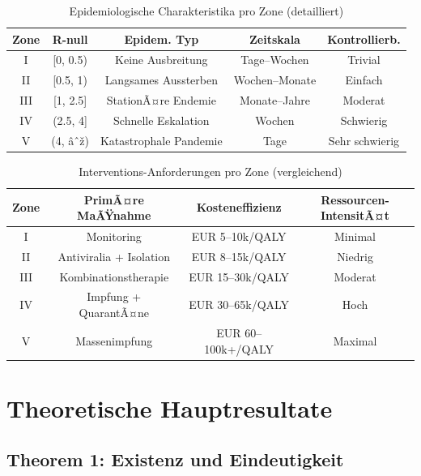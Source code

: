 ﻿\documentclass[a4paper,12pt,twoside]{article}
\theoremstyle{definition}
\begin{document}
\begin{table}[h!]
\centering
\caption{Epidemiologische Charakteristika pro Zone (detailliert)}
\label{tab:zones_detailed}
\begin{tabular}{|c|c|c|c|c|}
\hline
\textbf{Zone} & \textbf{R-null} & \textbf{Epidem. Typ} & \textbf{Zeitskala} & \textbf{Kontrollierb.} \\
\hline
I & [0, 0.5) & Keine Ausbreitung & Tage--Wochen & Trivial \\
II & [0.5, 1) & Langsames Aussterben & Wochen--Monate & Einfach \\
III & [1, 2.5] & StationÃ¤re Endemie & Monate--Jahre & Moderat \\
IV & (2.5, 4] & Schnelle Eskalation & Wochen & Schwierig \\
V & (4, âˆž) & Katastrophale Pandemie & Tage & Sehr schwierig \\
\hline
\end{tabular}
\end{table}

\begin{table}[h!]
\centering
\caption{Interventions-Anforderungen pro Zone (vergleichend)}
\label{tab:interventions_summary}
\begin{tabular}{|c|c|c|c|}
\hline
\textbf{Zone} & \textbf{PrimÃ¤re MaÃŸnahme} & \textbf{Kosteneffizienz} & \textbf{Ressourcen-IntensitÃ¤t} \\
\hline
I & Monitoring & EUR 5--10k/QALY & Minimal \\
II & Antiviralia + Isolation & EUR 8--15k/QALY & Niedrig \\
III & Kombinationstherapie & EUR 15--30k/QALY & Moderat \\
IV & Impfung + QuarantÃ¤ne & EUR 30--65k/QALY & Hoch \\
V & Massenimpfung & EUR 60--100k+/QALY & Maximal \\
\hline
\end{tabular}
\end{table}

\section{Theoretische Hauptresultate}
\label{sec:theorems}

\subsection{Theorem 1: Existenz und Eindeutigkeit}
\end{document}
